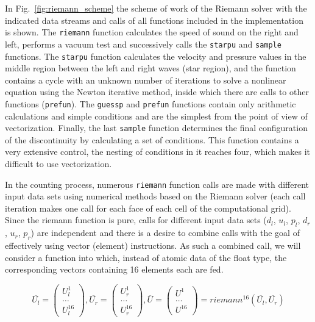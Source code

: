 \documentclass[
11pt,%
tightenlines,%
twoside,%
onecolumn,%
nofloats,%
nobibnotes,%
nofootinbib,%
superscriptaddress,%
noshowpacs,%
centertags]%
{revtex4}
\begin{document}
In Fig.~\ref{fig:riemann_scheme} the scheme of work of the Riemann solver with the indicated data streams and calls of all functions included in the implementation is shown.
The \texttt{riemann} function calculates the speed of sound on the right and left, performs a vacuum test and successively calls the \texttt{starpu} and \texttt{sample} functions.
The \texttt{starpu} function calculates the velocity and pressure values in the middle region between the left and right waves (star region), and the function contains a cycle with an unknown number of iterations to solve a nonlinear equation using the Newton iterative method, inside which there are calls to other functions (\texttt{prefun}).
The \texttt{guessp} and \texttt{prefun} functions contain only arithmetic calculations and simple conditions and are the simplest from the point of view of vectorization.
Finally, the last \texttt{sample} function determines the final configuration of the discontinuity by calculating a set of conditions.
This function contains a very extensive control, the nesting of conditions in it reaches four, which makes it difficult to use vectorization.

In the counting process, numerous \texttt{riemann} function calls are made with different input data sets using numerical methods based on the Riemann solver (each call iteration makes one call for each face of each cell of the computational grid).
Since the riemann function is pure, calls for different input data sets ($d_l$, $u_l$, $p_l$, $d_r$, $u_r$, $p_r$) are independent and there is a desire to combine calls with the goal of effectively using vector (element) instructions.
As such a combined call, we will consider a function into which, instead of atomic data of the float type, the corresponding vectors containing 16 elements each are fed.

\begin{equation}\label{eq:riemann_16}
\overline{U_l} = \left( \begin{array}{ccc} U_l^1 \\ \ldots \\ U_l^{16} \end{array} \right),
\overline{U_r} = \left( \begin{array}{ccc} U_r^1 \\ \ldots \\ U_r^{16} \end{array} \right),
\overline{U} = \left( \begin{array}{ccc} U^1 \\ \ldots \\ U^{16} \end{array} \right) = riemann^{16}(\overline{U_l}, \overline{U_r})
\end{equation}
\end{document}
